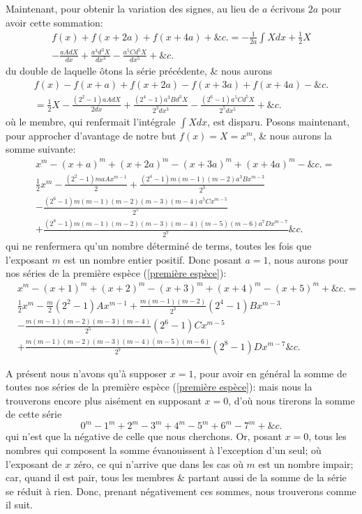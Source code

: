 \documentclass[12pt]{article}
\theoremstyle{definition}
\begin{document}
Maintenant, pour obtenir la variation des signes, au lieu de $a$ écrivons $2a$ pour avoir cette sommation:
\begin{align*}
  f(x) + f(x + 2a) + f(x + 4a) + \&c. = -\frac{1}{2a}\int Xdx + \frac{1}{2}X \\ 
  - \frac{aA dX}{dx} + \frac{a^3 d^3 X}{dx^3} - \frac{a^5 C d^5 X}{dx^5} + \&c.
\end{align*}
du double de laquelle ôtons la série précédente, \& nous aurons
\begin{align*}
  f(x)  - f(x + a) + f(x + 2a) - f(x + 3a) + f(x + 4a) - \&c. \\
  = \frac{1}{2}X - \frac{(2^2 - 1)a A dX}{2dx} + \frac{(2^4 - 1)a^3 Bd^3 X}{2^3 dx^3} - \frac{(2^6 - 1)a^5 Cd^5 X}{2^5 dx^5} + \&c.
\end{align*}
où le membre, qui renfermait l'intégrale $\int Xdx$, est disparu. Posons maintenant, pour approcher d'avantage de notre but $f(x) = X = x^m$, \& nous aurons la somme suivante:
\begin{align*}
  &x^m - (x + a)^m + (x + 2a)^m - (x + 3a)^m + (x + 4a)^m - \&c. = \\
  &\frac{1}{2}x^m - \frac{(2^2 - 1)ma A x^{m-1}}{2} + \frac{(2^4 - 1)m(m-1)(m-2)a^3 B x^{m-3}}{2^3}\\
  &- \frac{(2^6 - 1)m(m-1)(m-2)(m-3)(m-4)a^5 C x^{m-5}}{2^5}\\
  &+ \frac{(2^8 - 1)m(m-1)(m-2)(m-3)(m-4)(m-5)(m-6)a^7 D x^{m-7}}{2^7} \&c.
\end{align*}
qui ne renfermera qu'un nombre déterminé de terms, toutes les fois que l'exposant $m$ est un nombre entier positif. Donc posant $a = 1$, nous aurons pour nos séries de la première espèce (\ref{première espèce}):
\begin{align*}
  &x^m - (x + 1)^m + (x + 2)^m - (x + 3)^m + (x + 4)^m - (x + 5)^m + \&c. = \\
  &\frac{1}{2}x^m - \frac{m}{2}(2^2 - 1) A x^{m-1} + \frac{m(m-1)(m-2)}{2^3}(2^4 - 1)B x^{m-3}\\
  &- \frac{m(m-1)(m-2)(m-3)(m-4)}{2^5}(2^6 - 1) C x^{m-5}\\
  &+ \frac{m(m-1)(m-2)(m-3)(m-4)(m-5)(m-6)}{2^7}(2^8 - 1)D x^{m-7} \&c.
\end{align*}

A présent nous n'avons qu'à supposer $x = 1$, pour avoir en général la somme de toutes nos séries de la première espèce (\ref{première espèce}): mais nous la trouverons encore plus aisément en supposant $x = 0$, d'où nous tirerons la somme de cette série
$$0^m - 1^m + 2^m - 3^m + 4^m - 5^m + 6^m - 7^m + \&c.$$
qui n'est que la négative de celle que nous cherchons. Or, posant $x = 0$, tous les nombres qui composent la somme évanouissent à l'exception d'un seul; où l'exposant de $x$ zéro, ce qui n'arrive que dans les cas où $m$ est un nombre impair; car, quand il est pair, tous les membres \& partant aussi de la somme de la série se réduit à rien. Donc, prenant négativement ces sommes, nous trouverons comme il suit.
\end{document}
